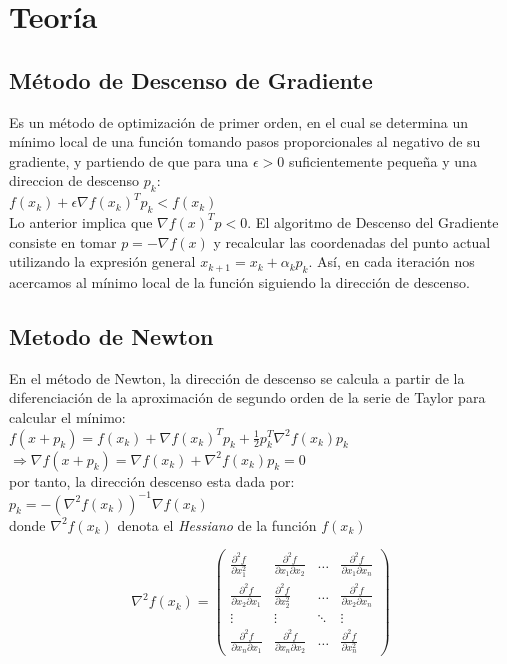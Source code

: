 \documentclass[10pt,journal,compsoc]{styles/IEEEtran}
\begin{document}
\section{Teor\'ia}

\subsection{M\'etodo de Descenso de Gradiente}

Es un m\'etodo de optimizaci\'on de primer orden, en el cual se determina un m\'inimo local de una funci\'on tomando pasos proporcionales al negativo de su gradiente, y partiendo de que para una $\epsilon>0$ suficientemente peque\~na y una direccion de descenso $p_k$:\\

$f(x_k) + \epsilon\nabla f(x_k)^T p_k<f(x_k)$\\

Lo anterior implica que $\nabla f(x)^T p<0$. El algoritmo de Descenso del Gradiente consiste en tomar $p=-\nabla f(x)$ y recalcular las coordenadas del punto actual utilizando la expresi\'on general $x_{k+1}=x_k +\alpha_k p_k$. As\'i, en cada iteraci\'on nos acercamos al m\'inimo local de la funci\'on siguiendo la direcci\'on de descenso.


\subsection{Metodo de Newton}

En el m\'etodo de Newton, la direcci\'on de descenso se calcula a partir de la diferenciaci\'on de la aproximaci\'on de segundo orden de la serie de Taylor para calcular el m\'inimo:\\

$f(x+p_k)=f(x_k)+\nabla f(x_k)^T p_k + \frac{1}{2}p_k^{T}\nabla^{2} f(x_k)p_k$\\

$\Rightarrow \nabla f(x+p_k)=\nabla f(x_k)+\nabla^{2} f(x_k)p_k=0$\\

por tanto, la direcci\'on descenso esta dada por:\\

$p_k=-(\nabla^{2}f(x_k))^{-1} \nabla f(x_k)$\\

donde $\nabla^{2}f(x_k)$ denota el \emph{Hessiano} de la funci\'on $f(x_k)$

\[\nabla^{2}f(x_k)= \left( \begin{array}{cccc}
\frac{\partial^2 f}{\partial x_1^2} & \frac{\partial^2 f}{\partial x_1 \partial x_2} & \ldots & \frac{\partial^2 f}{\partial x_1 \partial x_n} \\
\frac{\partial^2 f}{\partial x_2 \partial x_1} & \frac{\partial^2 f}{\partial x_2^2} & \ldots & \frac{\partial^2 f}{\partial x_2 \partial x_n} \\
\vdots & \vdots & \ddots & \vdots \\
\frac{\partial^2 f}{\partial x_n \partial x_1} & \frac{\partial^2 f}{\partial x_n \partial x_2} & \ldots & \frac{\partial^2 f}{\partial x_n^2}
\end{array} \right)\] 
\end{document}
